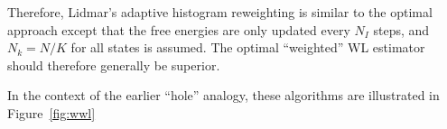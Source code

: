 \documentclass[superscriptaddress,showkeys, nofootinbib, pre, aps]{revtex4-1}
\begin{document}
Therefore, Lidmar's adaptive histogram reweighting is similar to the
optimal approach except that the free energies are only updated every
$N_I$ steps, and $N_k = N/K$ for all states is assumed.  The optimal
``weighted'' WL estimator should therefore generally be superior.

In the context of the earlier ``hole'' analogy, these algorithms are illustrated in Figure~\ref{fig:wwl}
\end{document}
